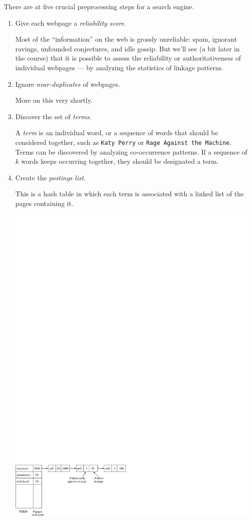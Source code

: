 There are at five crucial preprocessing steps for a search engine.
\begin{enumerate}
\item Give each webpage a {\it reliability score}.

Most of the ``information'' on the web is grossly unreliable: spam, ignorant ravings, unfounded conjectures, and idle gossip. But we'll see (a bit later in the course) that it is possible to assess the reliability or authoritativeness of individual webpages --- by analyzing the statistics of linkage patterns.

\item Ignore {\it near-duplicates} of webpages.

More on this very shortly.

\item Discover the set of {\it terms}.

A {\it term} is an individual word, or a sequence of words that should be considered together, such as {\tt Katy Perry} or {\tt Rage Against the Machine}. Terms can be discovered by analyzing co-occurrence patterns. If a sequence of $k$ words keeps occurring together, they should be designated a term.

\item Create the {\it postings list}.

This is a hash table in which each term is associated with a linked list of the pages containing it.

\begin{center}
\includegraphics[width=5in]{figs/postings.pdf}
\end{center}


\end{enumerate}

